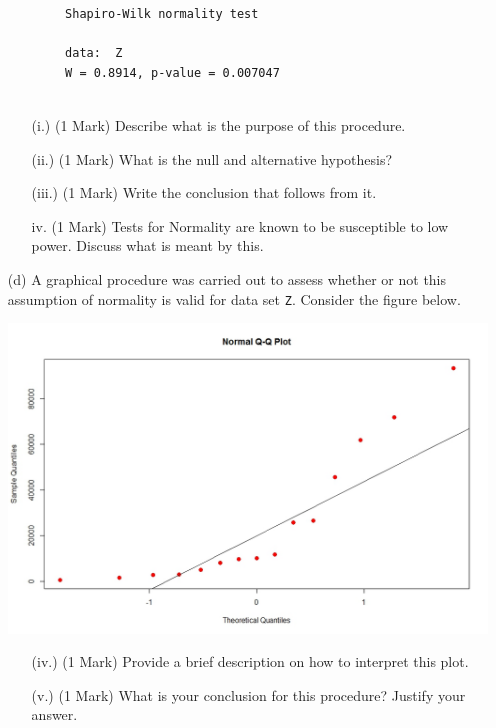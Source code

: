 \documentclass[a4paper,12pt]{article}
\begin{document}
\begin{itemize}
\begin{center}
\begin{framed}
\begin{verbatim}
		Shapiro-Wilk normality test
		
		data:  Z
		W = 0.8914, p-value = 0.007047
		
		\end{verbatim}
	\end{framed}
\end{center}


\begin{itemize}
	\item[(i.)] (1 Mark) Describe what is the purpose of this procedure.
	\item[(ii.)] (1 Mark) What is the null and alternative hypothesis?
	\item[(iii.)] (1 Mark) Write the conclusion that follows from it.
	\item[iv.] (1 Mark) Tests for Normality are known to be susceptible to low power. Discuss what is meant by this.
\end{itemize}


	\item[(d)] A graphical procedure was carried out to assess whether or not this assumption of normality is valid for data set \texttt{Z}. Consider the figure below.

\begin{center}
	\includegraphics[scale=0.40]{images/MT2016-QQPLOT}
\end{center}

\begin{itemize}
	\item[(iv.)] (1 Mark) Provide a brief description on how to interpret this plot.
	\item[(v.)] (1 Mark) What is your conclusion for this procedure? Justify your answer.
\end{itemize}




\end{itemize}
\end{document}
